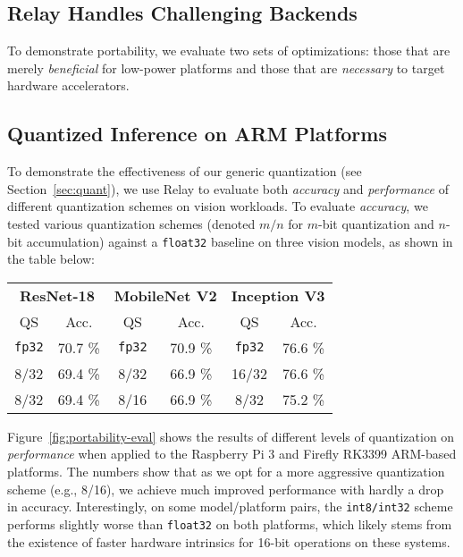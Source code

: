 \subsection{Relay Handles Challenging Backends}
\label{sec:low-power}
To demonstrate portability,
  we evaluate two sets of optimizations:
    those that are merely \textit{beneficial} for low-power platforms and
    those that are \textit{necessary} to target hardware accelerators.

\subsection{Quantized Inference on ARM Platforms}
To demonstrate the effectiveness of our generic quantization (see Section~\ref{sec:quant}),
  we use Relay to evaluate both \textit{accuracy} and \textit{performance} of different
  quantization schemes on vision workloads.
To evaluate \textit{accuracy},
  we tested various quantization schemes
  (denoted $m/n$ for $m$-bit quantization and $n$-bit accumulation)
  against a \texttt{float32} baseline on three vision models,
  as shown in the table below:
\begin{center}
  \begin{tabular}{|c|c||c|c||c|c|}
    \hline
    \multicolumn{2}{|c}{\textbf{ResNet-18}} & \multicolumn{2}{c}{\textbf{MobileNet V2}} & \multicolumn{2}{c|}{\textbf{Inception V3}} \\
    \multicolumn{1}{|c}{QS}    & \multicolumn{1}{c}{Acc.}   &  \multicolumn{1}{c}{QS}  & \multicolumn{1}{c}{Acc.}  & \multicolumn{1}{c}{QS}  & \multicolumn{1}{c|}{Acc.} \\
    \hline
    \texttt{fp32} & 70.7 \%    & \texttt{fp32} & 70.9 \%       & \texttt{fp32} & 76.6 \% \\
    8/32         & 69.4 \%    & 8/32         & 66.9 \%       & 16/32        & 76.6 \% \\
    8/32         & 69.4 \%    & 8/16         & 66.9 \%       & 8/32         & 75.2 \% \\
    \hline
  \end{tabular}
\end{center}
Figure~\ref{fig:portability-eval} shows the results of different
  levels of quantization on \textit{performance} when applied to the Raspberry Pi 3
  and Firefly RK3399 ARM-based platforms.
The numbers show that as we opt for a more aggressive quantization scheme
  (e.g., 8/16),
  we achieve much improved performance with hardly a drop in accuracy.
Interestingly,
  on some model/platform pairs,
  the \texttt{int8/int32} scheme performs slightly worse than \texttt{float32} on both platforms,
  which likely stems from the existence of faster hardware intrinsics for 16-bit operations on these systems.


